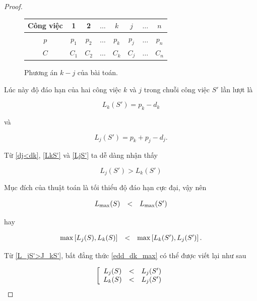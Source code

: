 \begin{proof}
	\begin{figure}[h!]
		\centering
		 \begin{tabular}{|c | c c c c c c c |} 
		 \hline
		 Công việc & 1 & 2 & $\ldots$ & $k$ & $j$ & $\ldots$ & $n$ \\
		 \hline\hline
		 $p$ & $p_1$ & $p_2$ & $\ldots$ & $p_k$ & $p_j$ & $\ldots$ & $p_n$ \\
		 $C$ & $C_1$ & $C_2$ & $\ldots$ & $C_k$ & $C_j$ & $\ldots$ & $C_n$ \\
		 \hline
		 \end{tabular}
	\caption{\label{jk_edd2}Phương án $k - j$ của bài toán.}
	\end{figure}

	Lúc này độ đáo hạn của hai công việc $k$ và $j$ trong chuỗi công việc $S'$ lần lượt là

	\begin{equation} \label{LkS'}
		L_k(S') = p_k - d_k
	\end{equation}

	và

	\begin{equation} \label{LjS'}
		L_j(S') = p_k + p_j - d_j.
	\end{equation}

	Từ \eqref{dj<dk}, \eqref{LkS'} và \eqref{LjS'} ta dễ dàng nhận thấy

	\begin{equation} \label{L_jS'>J_kS'}
		L_j(S') > L_k(S')
	\end{equation}

	Mục đích của thuật toán là tối thiểu độ đáo hạn cực đại, vậy nên

	\begin{equation}
	\begin{array}{c c c}
		L_{\max}(S) & < & L_{\max}(S')
	\end{array}
	\end{equation}

	hay

	\begin{equation} \label{edd_dk_max}
		\begin{array}{c c c}
			\max \left[ L_j(S), L_k(S) \right] & < & \max \left[ L_k(S'), L_j(S') \right].
		\end{array}
	\end{equation}

	Từ \eqref{L_jS'>J_kS'}, bất đẳng thức \eqref{edd_dk_max} có thể được viết lại như sau
	
	\begin{equation}
		\left[
			\begin{array}{c c c}
				L_j(S) & < & L_j(S') \\
				L_k(S) & < & L_j(S')
			\end{array}
		\right.
	\end{equation}


\end{proof}
